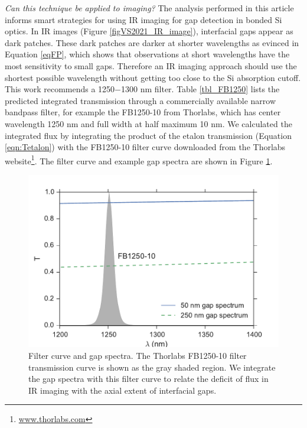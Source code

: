 \documentclass[osajnl,preprint,showpacs,superscriptaddress,12pt]{revtex4-1} %
\begin{document}
\emph{Can this technique be applied to imaging?}  The analysis performed in this article informs smart strategies for using IR imaging for gap detection in bonded Si optics.  In IR images (Figure \ref{figVS2021_IR_image}), interfacial gaps appear as dark patches.  These dark patches are darker at shorter wavelengths as evinced in Equation \ref{eqFP}, which shows that observations at short wavelengths have the most sensitivity to small gaps.  Therefore an IR imaging approach should use the shortest possible wavelength without getting too close to the Si absorption cutoff.  This work recommends a 1250$-$1300 nm filter.  Table \ref{tbl_FB1250} lists the predicted integrated transmission through a commercially available narrow bandpass filter, for example the FB1250-10 from Thorlabs, which has center wavelength 1250 nm and full width at half maximum 10 nm.  We calculated the integrated flux by integrating the product of the etalon transmission (Equation \ref{eqn:Tetalon}) with the FB1250-10 filter curve downloaded from the Thorlabs website\footnote{\url{www.thorlabs.com}}.  The filter curve and example gap spectra are shown in Figure \ref{figFB1250-10}.

\begin{figure}[htbp]
\includegraphics[width=0.8\columnwidth]{figs/F1250_10_filter.pdf}
\caption{\label{figFB1250-10} Filter curve and gap spectra.  The Thorlabs FB1250-10 filter transmission curve is shown as the gray shaded region.  We integrate the gap spectra with this filter curve to relate the deficit of flux in IR imaging with the axial extent of interfacial gaps.}
\end{figure}


\end{document}
